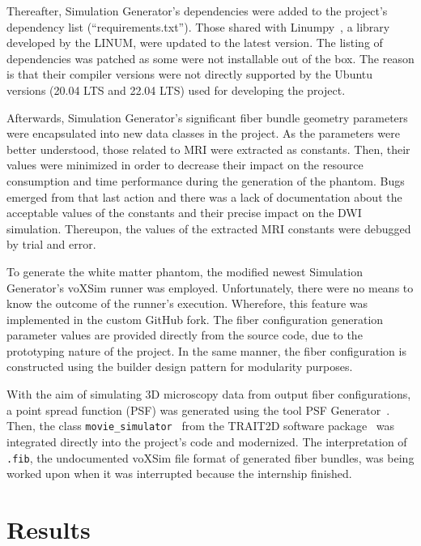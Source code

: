 \documentclass{article}
\begin{document}
  Thereafter, Simulation Generator's dependencies were added to the project's dependency list (``requirements.txt'').
  Those shared with Linumpy~\cite{linum2022linumpy}, a library developed by the LINUM, were updated to the latest version.
  The listing of dependencies was patched as some were not installable out of the box.
  The reason is that their compiler versions were not directly supported by the Ubuntu versions (20.04 LTS and 22.04 LTS) used for developing the project.

  Afterwards, Simulation Generator's significant fiber bundle geometry parameters were encapsulated into new data classes in the project.
  As the parameters were better understood, those related to MRI were extracted as constants.
  Then, their values were minimized in order to decrease their impact on the resource consumption and time performance during the generation of the phantom.
  Bugs emerged from that last action and there was a lack of documentation about the acceptable values of the constants and their precise impact on the DWI simulation.
  Thereupon, the values of the extracted MRI constants were debugged by trial and error.

  To generate the white matter phantom, the modified newest Simulation Generator's voXSim runner was employed.
  Unfortunately, there were no means to know the outcome of the runner's execution.
  Wherefore, this feature was implemented in the custom GitHub fork.
  The fiber configuration generation parameter values are provided directly from the source code, due to the prototyping nature of the project.
  In the same manner, the fiber configuration is constructed using the builder design pattern for modularity purposes.

  With the aim of simulating 3D microscopy data from output fiber configurations, a point spread function (PSF) was generated using the tool PSF Generator~\cite{kirshnersage2017psfgenerator}.
  Then, the class \lstinline!movie_simulator!~\cite{lefebvre2021trait2dmoviesim} from the TRAIT2D software package~\cite{reina2021trait2d} was integrated directly into the project's code and modernized.
  The interpretation of \lstinline!.fib!, the undocumented voXSim file format of generated fiber bundles, was being worked upon when it was interrupted because the internship finished.



  \section{Results}\label{sec:results}
\end{document}
